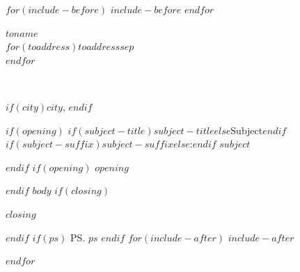 \documentclass[$if(fontsize)$$fontsize$$else$11pt$endif$,a4paper,$for(classoption)$$classoption$$sep$,$endfor$]{letter}
\date{$date$}
\date{\Date~\Month~\Year}
\makeatletter
\newcommand*{\recipient}{%
{\raggedleft \toname \\ \toaddress \par}%
  \vspace{2\parskip}%
}
\newcommand*{\local}{
  {$if(city)$$city$, $endif$\raggedleft \@date\par}%
  \vspace{2\parskip}%
}
\newcommand{\subject}{$if(subject-title)$$subject-title$$else$Subject$endif$$if(subject-suffix)$$subject-suffix$$else$:$endif$ $subject$
\vspace{2\parskip}%
\par\nobreak
}
\renewcommand*{\opening}[1]{%
  #1\par\nobreak}
\makeatother
\begin{document}
$for(include-before)$
$include-before$
$endfor$
\begin{letter}{$toname$\\$for(toaddress)$$toaddress$$sep$\\$endfor$}
\recipient
\local
$if(opening)$
\subject
$endif$
$if(opening)$
\opening{$opening$}
$endif$
$body$
$if(closing)$
\closing{$closing$}%
{\raggedleft {}}
$endif$
$if(ps)$
\ps{$ps$}
$endif$
$for(include-after)$
$include-after$

$endfor$
\end{letter}
\end{document}
